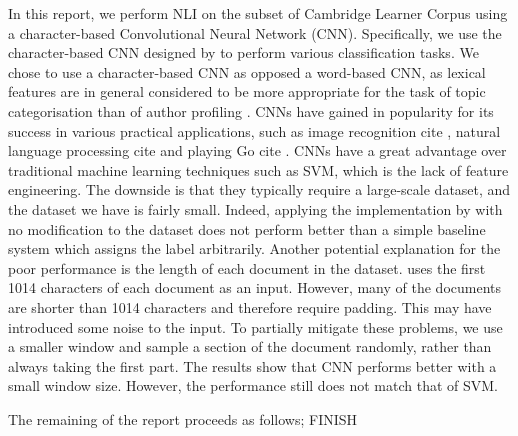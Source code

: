 In this report, we perform NLI on the subset of Cambridge Learner Corpus \citep{nicholls2003cambridge, yannakoudakis2011new} using a character-based Convolutional Neural Network (CNN).
Specifically, we use the character-based CNN designed by \cite{zhang2015character} to perform various classification tasks.
We chose to use a character-based CNN as opposed a word-based CNN, as lexical features are in general considered to be more appropriate for the task of topic categorisation than of author profiling \citep{kochmar2011identification}.
CNNs have gained in popularity for its success in various practical applications, such as image recognition \color{red} cite \color{black}, natural language processing  \color{red} cite \color{black} and playing Go \color{red} cite \color{black}.
CNNs have a great advantage over traditional machine learning techniques such as SVM, which is the lack of feature engineering.
The downside is that they typically require a large-scale dataset, and the dataset we have is fairly small.
Indeed, applying the implementation by \cite{zhang2015character} with no modification to the dataset does not perform better than a simple baseline system which assigns the label arbitrarily.
Another potential explanation for the poor performance is the length of each document in the dataset.
\cite{zhang2015character} uses the first 1014 characters of each document as an input.
However, many of the documents are shorter than 1014 characters and therefore require padding.
This may have introduced some noise to the input.
To partially mitigate these problems, we use a smaller window and sample a section of the document randomly, rather than always taking the first part.
The results show that CNN performs better with a small window size.
However, the performance still does not match that of SVM.

The remaining of the report proceeds as follows; \color{red} FINISH \color{black}